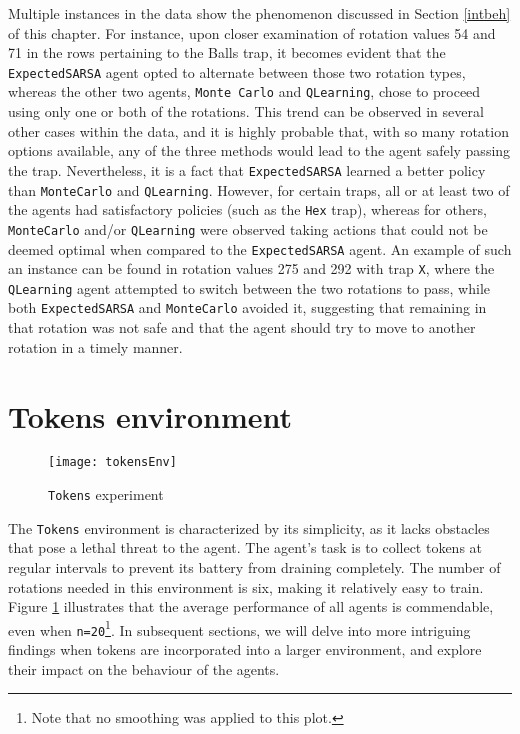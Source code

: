 Multiple instances in the data show the phenomenon discussed in Section \ref{intbeh} of this chapter. For instance, upon closer examination of rotation values 54 and 71 in the rows pertaining to the Balls trap, it becomes evident that the \texttt{ExpectedSARSA} agent opted to alternate between those two rotation types, whereas the other two agents, \texttt{Monte Carlo} and \texttt{QLearning}, chose to proceed using only one or both of the rotations. This trend can be observed in several other cases within the data, and it is highly probable that, with so many rotation options available, any of the three methods would lead to the agent safely passing the trap. Nevertheless, it is a fact that \texttt{ExpectedSARSA} learned a better policy than \texttt{MonteCarlo} and \texttt{QLearning}. However, for certain traps, all or at least two of the agents had satisfactory policies (such as the \texttt{Hex} trap), whereas for others, \texttt{MonteCarlo} and/or \texttt{QLearning} were observed taking actions that could not be deemed optimal when compared to the \texttt{ExpectedSARSA} agent. An example of such an instance can be found in rotation values 275 and 292 with trap \texttt{X}, where the \texttt{QLearning} agent attempted to switch between the two rotations to pass, while both \texttt{ExpectedSARSA} and \texttt{MonteCarlo} avoided it, suggesting that remaining in that rotation was not safe and that the agent should try to move to another rotation in a timely manner.

\section{Tokens environment}
\begin{figure}[h]
    \centering
    \texttt{[image: tokensEnv]}
    \caption{\texttt{Tokens} experiment}
    \label{fig:tokens}
\end{figure}

The \texttt{Tokens} environment is characterized by its simplicity, as it lacks obstacles that pose a lethal threat to the agent. The agent's task is to collect tokens at regular intervals to prevent its battery from draining completely. The number of rotations needed in this environment is six, making it relatively easy to train. Figure \ref{fig:tokens} illustrates that the average performance of all agents is commendable, even when \texttt{n=20}\footnote{Note that no smoothing was applied to this plot.}. In subsequent sections, we will delve into more intriguing findings when tokens are incorporated into a larger environment, and explore their impact on the behaviour of the agents.

